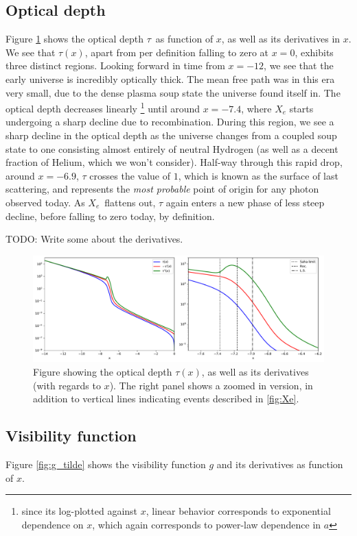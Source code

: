 \documentclass[10pt, a4paper]{article}
\begin{document}
\subsection{Optical depth}
Figure \ref{fig:tau} shows the optical depth $\tau$ as function of $x$, as well as its derivatives in $x$. We see that $\tau(x)$, apart from per definition falling to zero at $x=0$, exhibits three distinct regions. Looking forward in time from $x=-12$, we see that the early universe is incredibly optically thick. The mean free path was in this era very small, due to the dense plasma soup state the universe found itself in. The optical depth decreases linearly \footnote{since its log-plotted against $x$, linear behavior corresponds to exponential dependence on $x$, which again corresponds to power-law dependence in $a$} until around $x=-7.4$, where $X_e$ starts undergoing a sharp decline due to recombination. During this region, we see a sharp decline in the optical depth as the universe changes from a coupled soup state to one consisting almost entirely of neutral Hydrogen (as well as a decent fraction of Helium, which we won't consider). Half-way through this rapid drop, around $x=-6.9$, $\tau$ crosses the value of $1$, which is known as the surface of last scattering, and represents the \textit{most probable} point of origin for any photon observed today. As $X_e$ flattens out, $\tau$ again enters a new phase of less steep decline, before falling to zero today, by definition.

TODO: Write some about the derivatives.


\begin{figure}[H]
    \centering
    \includegraphics[scale=0.5]{../m2_figs/tau.pdf}
    \caption{Figure showing the optical depth $\tau(x)$, as well as its derivatives (with regards to $x$). The right panel shows a zoomed in version, in addition to vertical lines indicating events described in \ref{fig:Xe}.}
    \label{fig:tau}
\end{figure}


\subsection{Visibility function}\label{sec:results:g_tilde}
Figure \ref{fig:g_tilde} shows the visibility function $g$ and its derivatives as function of $x$. 
\end{document}
